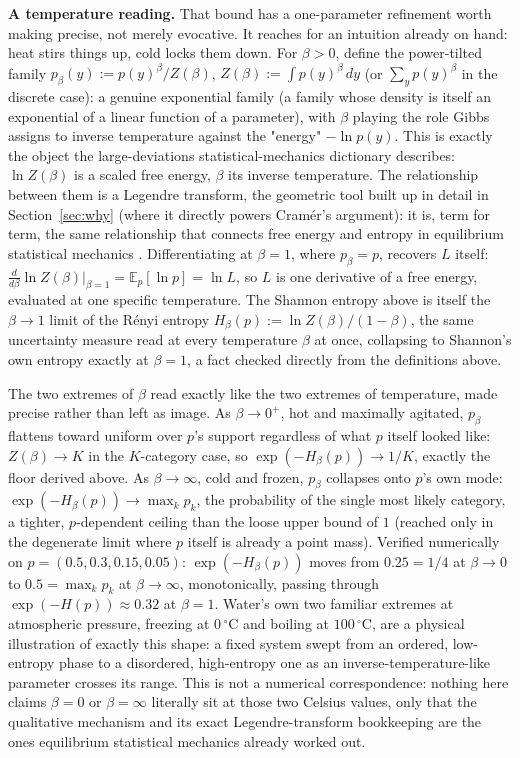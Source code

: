 \documentclass[11pt]{article}
\begin{document}
\textbf{A temperature reading.} That bound has a one-parameter
refinement worth making precise, not merely evocative. It
reaches for an intuition already on hand: heat stirs things up, cold
locks them down. For $\beta > 0$, define the power-tilted family
$p_\beta(y) := p(y)^\beta / Z(\beta)$, $Z(\beta) := \int
p(y)^\beta\,dy$ (or $\sum_y p(y)^\beta$ in the discrete case): a
genuine exponential family (a family whose density is itself an
exponential of a linear function of a parameter), with $\beta$ playing
the role Gibbs assigns to inverse temperature against the "energy"
$-\ln p(y)$. This
is exactly the object the large-deviations statistical-mechanics
dictionary describes: $\ln Z(\beta)$ is a scaled free energy, $\beta$
its inverse temperature. The relationship between them is a Legendre
transform, the geometric tool built up in detail in
Section~\ref{sec:why} (where it directly powers Cram\'er's argument):
it is, term for term, the same relationship that connects free energy
and entropy in equilibrium statistical mechanics \citep{touchette2009}.
Differentiating at $\beta=1$, where $p_\beta = p$, recovers $L$ itself:
$\frac{d}{d\beta} \ln Z(\beta)\big|_{\beta=1} = \mathbb E_p[\ln p] =
\ln L$, so $L$ is one derivative of a free energy, evaluated at one
specific temperature. The Shannon entropy above is itself the $\beta
\to 1$ limit of the R\'enyi entropy $H_\beta(p) := \ln
Z(\beta)/(1-\beta)$, the same uncertainty measure read at every
temperature $\beta$ at once, collapsing to Shannon's own entropy
exactly at $\beta=1$, a fact checked directly from the definitions
above.

The two extremes of $\beta$ read exactly like the two extremes of
temperature, made precise rather than left as image. As $\beta \to
0^+$, hot and maximally agitated, $p_\beta$ flattens toward uniform
over $p$'s support regardless of what $p$ itself looked like: $Z(\beta)
\to K$ in the $K$-category case, so $\exp(-H_\beta(p)) \to 1/K$,
exactly the floor derived above. As $\beta \to \infty$, cold and
frozen, $p_\beta$ collapses onto $p$'s own mode: $\exp(-H_\beta(p)) \to
\max_k p_k$, the probability of the single most likely category, a
tighter, $p$-dependent ceiling than the loose upper bound of $1$
(reached only in the degenerate limit where $p$ itself is already a
point mass). Verified numerically on $p = (0.5, 0.3, 0.15, 0.05)$:
$\exp(-H_\beta(p))$ moves from $0.25 = 1/4$ at $\beta \to 0$ to $0.5 =
\max_k p_k$ at $\beta \to \infty$, monotonically, passing through
$\exp(-H(p)) \approx 0.32$ at $\beta = 1$. Water's own two familiar
extremes at atmospheric pressure, freezing at $0\,^\circ\mathrm C$ and
boiling at $100\,^\circ\mathrm C$, are a physical illustration of
exactly this shape: a fixed system swept from an ordered, low-entropy
phase to a disordered, high-entropy one as an inverse-temperature-like
parameter crosses its range. This is not a numerical correspondence:
nothing here claims $\beta = 0$ or $\beta = \infty$ literally sit at
those two Celsius values, only that the qualitative mechanism and its
exact Legendre-transform bookkeeping are the ones equilibrium
statistical mechanics already worked out.
\end{document}
